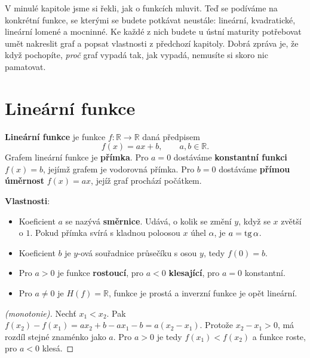 \label{kap:elementarni}

V minulé kapitole jsme si řekli, jak o funkcích mluvit. Teď se podíváme na konkrétní funkce, se kterými se budete potkávat neustále: lineární, kvadratické, lineární lomené a mocninné. Ke každé z nich budete u ústní maturity potřebovat umět nakreslit graf a popsat vlastnosti z předchozí kapitoly. Dobrá zpráva je, že když pochopíte, \textit{proč} graf vypadá tak, jak vypadá, nemusíte si skoro nic pamatovat.

\section{Lineární funkce}\label{sec:linearni-funkce}

\begin{definitionbox}
  \textbf{Lineární funkce} je funkce $f: \mathbb{R}\to\mathbb{R}$ daná předpisem
  \begin{equation*}
    f(x) = ax + b,\qquad a, b\in\mathbb{R}.
  \end{equation*}
  Grafem lineární funkce je \textbf{přímka}. Pro $a = 0$ dostáváme \textbf{konstantní funkci} $f(x) = b$, jejímž grafem je vodorovná přímka. Pro $b = 0$ dostáváme \textbf{přímou úměrnost} $f(x) = ax$, jejíž graf prochází počátkem.

  \vspace{0.2cm}

  \textbf{Vlastnosti}:
  \begin{itemize}
    \item Koeficient $a$ se nazývá \textbf{směrnice}. Udává, o kolik se změní $y$, když se $x$ zvětší o $1$. Pokud přímka svírá s kladnou poloosou $x$ úhel $\alpha$, je $a = \operatorname{tg}\alpha$.
    \item Koeficient $b$ je $y$-ová souřadnice průsečíku s osou $y$, tedy $f(0) = b$.
    \item Pro $a > 0$ je funkce \textbf{rostoucí}, pro $a < 0$ \textbf{klesající}, pro $a = 0$ konstantní.
    \item Pro $a\neq 0$ je $H(f) = \mathbb{R}$, funkce je prostá a inverzní funkce je opět lineární.
  \end{itemize}
\end{definitionbox}

\begin{proof}[(monotonie)]
  Nechť $x_1 < x_2$. Pak $f(x_2) - f(x_1) = ax_2 + b - ax_1 - b = a(x_2 - x_1)$. Protože $x_2 - x_1 > 0$, má rozdíl stejné znaménko jako $a$. Pro $a > 0$ je tedy $f(x_1) < f(x_2)$ a funkce roste, pro $a < 0$ klesá.
\end{proof}

